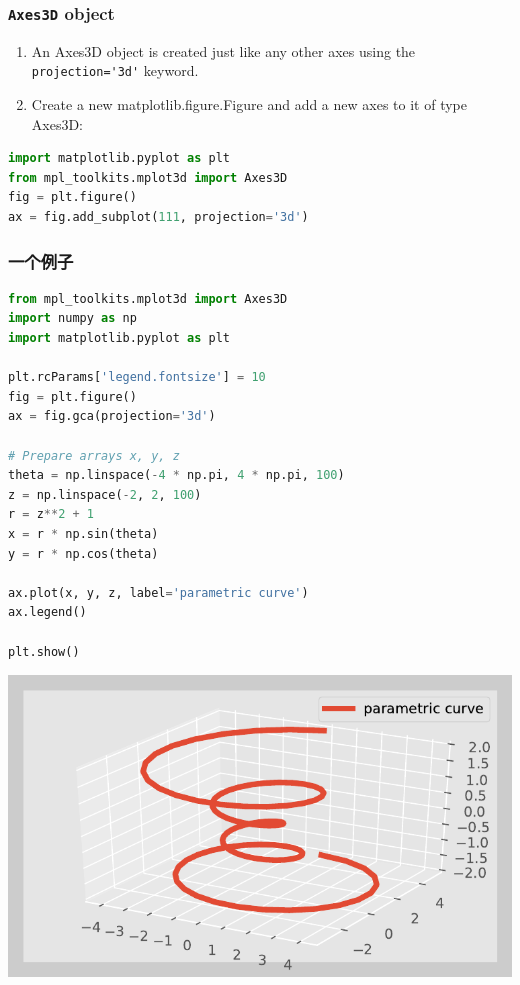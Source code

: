 \documentclass[UTF8,a4paper,12pt]{ctexart}  %
\providecommand{\tightlist}{\setlength{\itemsep}{0pt}\setlength{\parskip}{0pt}}
\newcommand{\passthrough}[1]{\lstset{mathescape=false}#1\lstset{mathescape=true}}
\begin{document}
\hypertarget{axes3d-object}{%
\subsubsection{\texorpdfstring{\texttt{Axes3D} object}{Axes3D object}}\label{axes3d-object}}

\begin{enumerate}
\def\labelenumi{\arabic{enumi}.}
\tightlist
\item
  An Axes3D object is created just like any other axes using the
  \passthrough{\lstinline!projection='3d'!} keyword.
\item
  Create a new matplotlib.figure.Figure and add a new axes to it of
  type Axes3D:
\end{enumerate}

\begin{lstlisting}[language=Python]
import matplotlib.pyplot as plt
from mpl_toolkits.mplot3d import Axes3D
fig = plt.figure()
ax = fig.add_subplot(111, projection='3d')
\end{lstlisting}

\hypertarget{ux4e00ux4e2aux4f8bux5b50}{%
\subsubsection{一个例子}\label{ux4e00ux4e2aux4f8bux5b50}}

\begin{lstlisting}[language=Python]
from mpl_toolkits.mplot3d import Axes3D
import numpy as np
import matplotlib.pyplot as plt

plt.rcParams['legend.fontsize'] = 10
fig = plt.figure()
ax = fig.gca(projection='3d')

# Prepare arrays x, y, z
theta = np.linspace(-4 * np.pi, 4 * np.pi, 100)
z = np.linspace(-2, 2, 100)
r = z**2 + 1
x = r * np.sin(theta)
y = r * np.cos(theta)

ax.plot(x, y, z, label='parametric curve')
ax.legend()

plt.show()
\end{lstlisting}

\begin{center}\includegraphics[width=0.9\linewidth]{python-visualization_files/figure-latex/unnamed-chunk-56-1} \end{center}
\end{document}
